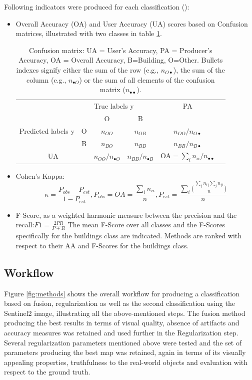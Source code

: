 \documentclass[10pt]{article}
\begin{document}
Following indicators were produced for each classification (\cite{deMorsier}):
\begin{itemize}
    \item Overall Accuracy (OA) and User Accuracy (UA) scores based on Confusion matrices, illustrated with two classes in table \ref{table:cm}.
    \begin{table}[H]
		\centering
		\begin{tabular}{cc|c|c|cl}
			& & \multicolumn{2}{l|}{True labels y}&PA\\
			\multirow{3}{*}{Predicted labels y} &  & O& B  &\\ \cline{1-5} 
			& O &  $n_{OO}$ & $n_{OB}$ &$n_{OO}/n_{O\bullet}$\\ \cline{2-5} 
			& B & $n_{BO}$ & $n_{BB}$  &$n_{BB}/n_{B\bullet}$\\ \cline{1-5} 
			\multicolumn{2}{c|}{UA} & $n_{OO}/n_{\bullet O}$ & $n_{BB}/n_{\bullet B}$&OA$=\sum_in_{ii}/n_{\bullet\bullet}$\\
		\end{tabular}
		\caption{Confusion matrix: UA = User's Accuracy, PA = Producer's Accuracy, OA = Overall Accuracy, B=Building, O=Other. Bullets indexes signify either the sum of the row (e.g., $n_{O\bullet}$), the sum of the column (e.g., $n_{\bullet O}$) or the sum of all elements of the confusion matrix ($n_{\bullet\bullet}$).}
		\label{table:cm}
	\end{table}
	\item Cohen's Kappa:
	\begin{equation}
	    \kappa=\frac{P_{obs}-P_{est}}{1-P_{est}},P_{obs}=OA=\frac{\sum_in_{ii}}{n}, P_{est}=\frac{\sum_i\big(\frac{\sum_jn_{ij}\sum_jn_{ji}}{n}\big)}{n}
	\end{equation}
	\item F-Score, as a weighted harmonic measure between the precision and the recall:$     F1=\frac{2PR}{P+R}$
    The mean F-Score over all classes and the F-Scores specifically for the buildings class are indicated. Methods are ranked with respect to their AA and F-Scores for the buildings class.
\end{itemize}


\subsection{Workflow}
Figure \ref{fig:methods} shows the overall workflow for producing a classification based on fusion, regularization as well as the second classification using the Sentinel2 image, illustrating all the above-mentioned steps. The fusion method producing the best results in terms of visual quality, absence of artifacts and accuracy measures was retained and used further in the Regularization step. Several regularization parameters mentioned above were tested and the set of parameters producing the best map was retained, again in terms of its visually appealing properties, truthfulness to the real-world objects and evaluation with respect to the ground truth.
\end{document}
